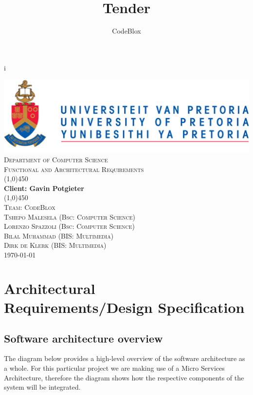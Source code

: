 i\documentclass[a4paper,12pt]{article}
\author{CodeBlox}
\title{Tender}
\begin{document}
	\setlength{\parskip}{6pt}
	
	\begin{titlepage}
		\begin{center}
			\includegraphics[width=1\textwidth]{./Pictures/up_logo.png}\\[1.5cm] 
			\textsc{\LARGE Department of Computer Science} \\ [.5cm]
			\textsc{\Large Functional and Architectural Requirements} \\ [.5cm]
			\line(1,0){450}\\[.5cm]
			\huge{\bfseries Client: Gavin Potgieter}\\
			\line(1,0){450}\\[.5cm]
			\textsc{\LARGE Team: CodeBlox}\\ [0.5cm]
			
			
			\textsc{\large Tshepo Malesela (Bsc: Computer Science)}\\
			\textsc{\large Lorenzo Spazzoli (Bsc: Computer Science)}\\
			\textsc{\large Bilal Muhammad (BIS: Multimedia)}\\
			\textsc{\large Dirk de Klerk (BIS: Multimedia)}\\ [3.9cm]
			
			\large\today
		\end{center}
	\end{titlepage}
	
	\tableofcontents
	\thispagestyle{empty}
	\footnotesize
	\normalsize
	
	\newpage
	\section{Architectural Requirements/Design Specification}
	
	\subsection{Software architecture overview}
	
	The diagram below provides a high-level overview of the software architecture as a whole. For this particular project we are making use of a Micro Services Architecture, therefore the diagram shows how the respective components of the system will be integrated.\\
	
\end{document}
